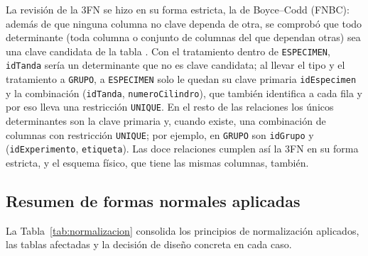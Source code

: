 La revisión de la 3FN se hizo en su forma estricta, la de Boyce--Codd (FNBC):
además de que ninguna columna no clave dependa de otra, se comprobó que todo
determinante (toda columna o conjunto de columnas del que dependan otras) sea una
clave candidata de la tabla \cite{elmasri2015}. Con el tratamiento dentro de
\texttt{ESPECIMEN}, \texttt{idTanda} sería un determinante que no es clave
candidata; al llevar el tipo y el tratamiento a \texttt{GRUPO}, a
\texttt{ESPECIMEN} solo le quedan su clave primaria \texttt{idEspecimen} y la
combinación (\texttt{idTanda}, \texttt{numeroCilindro}), que también identifica a
cada fila y por eso lleva una restricción \texttt{UNIQUE}. En el resto de las
relaciones los únicos determinantes son la clave primaria y, cuando existe, una
combinación de columnas con restricción \texttt{UNIQUE}; por ejemplo, en
\texttt{GRUPO} son \texttt{idGrupo} y (\texttt{idExperimento}, \texttt{etiqueta}). Las doce relaciones cumplen así la
3FN en su forma estricta, y el esquema físico, que tiene las mismas columnas,
también.

\subsection{Resumen de formas normales aplicadas}

La Tabla~\ref{tab:normalizacion} consolida los principios de normalización aplicados,
las tablas afectadas y la decisión de diseño concreta en cada caso.

